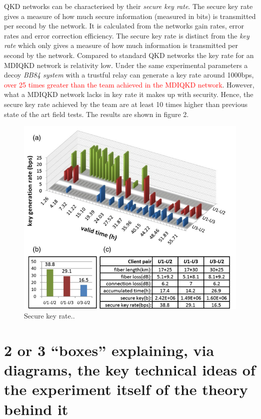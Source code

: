 \documentclass{article}
\begin{document}
QKD networks can be characterised by their \textit{secure key rate}.  The secure key rate gives a measure of how much secure information (measured in bits) is transmitted per second by the network. It is calculated from the networks gain rates, error rates and error correction efficiency. The secure key rate is distinct from the \textit{key rate} which only gives a measure of how much information is transmitted per second by the network. Compared to standard QKD networks the key rate for an MDIQKD network is relativity low. Under the same experimental parameters a decoy \textit{BB84 system} with a trustful relay can generate a key rate around 1000bps, \textcolor{red}{over 25 times greater than the team achieved in the MDIQKD network}. However, what a MDIQKD network lacks in key rate it makes up with security. Hence, the secure key rate achieved by the team are at least 10 times higher than previous state of the art field tests. The results are shown in figure 2.

    
\begin{figure}
  \centering 
  \includegraphics[width=0.7\linewidth]{Results.png}
  \caption{Secure key rate.\cite{PhysRevX.6.011024}.}
  \label{figure 2}
\end{figure}

\section*{2 or 3 “boxes” explaining, via diagrams, the key technical ideas of the experiment itself of the theory behind it}
\end{document}
